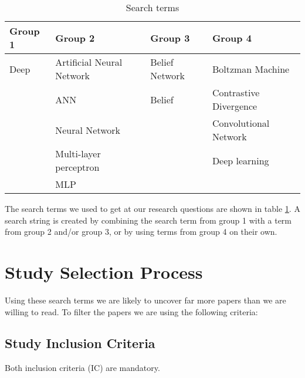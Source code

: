 \documentclass[11pt]{article}
\begin{document}
\begin{table}[htb!]
\begin{tabular}{|l|l|l|l|}\hline
Group 1 & Group 2 & Group 3 & Group 4 \\ \hline
Deep & Artificial Neural Network & Belief Network & Boltzman Machine \\ \hline
 & ANN & Belief & Contrastive Divergence \\ \hline
 & Neural Network &  & Convolutional Network \\ \hline
 & Multi-layer perceptron &  & Deep learning \\\hline
 & MLP &  &  \\ \hline
 \end{tabular}
 \caption{Search terms}
 \label{tbl:terms}
\end{table}
\begin{comment}
#+ORGTBL: SEND terms orgtbl-to-latex :splice nil :skip 0
| Group 1 | Group 2                   | Group 3        | Group 4                |
| Deep    | Artificial Neural Network | Belief Network | Boltzman Machine       |
|         | ANN                       | Belief         | Contrastive Divergence |
|         | Neural Network            |                | Convolutional Network  |
|         | Multi-layer perceptron    |                | Deep learning          |
|         | MLP                       |                |                        |
\end{comment}

The search terms we used to get at our research questions are shown in table \ref{tbl:terms}.  A search string is created by combining the search term from group 1 with a term from group 2 and/or group 3, or by using terms from group 4 on their own.

\newpage
\section{Study Selection Process}

Using these search terms we are likely to uncover far more papers than we are willing to read.  To filter the papers we are using the following criteria:

\subsection{Study Inclusion Criteria}

Both inclusion criteria (IC) are mandatory.
\end{document}

